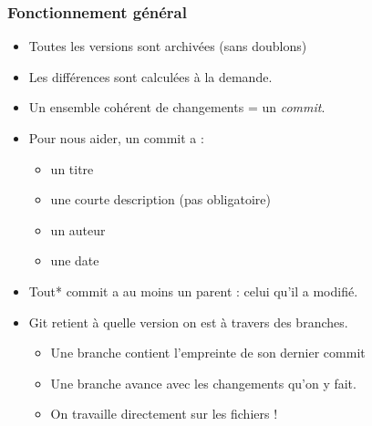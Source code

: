 \documentclass[compress]{beamer}
\begin{document}
\begin{frame}
	\frametitle{Fonctionnement général}
	\begin{itemize}
		\item Toutes les versions sont archivées (sans doublons) \pause
		\item Les différences sont calculées à la demande. \pause
		\item Un ensemble cohérent de changements = un \emph{commit}. \pause
		\item Pour nous aider, un commit a :
			\begin{itemize}
				\item un titre
				\item une courte description (pas obligatoire) \pause
				\item un auteur
				\item une date \pause
			\end{itemize}
		\item Tout* commit a au moins un parent : celui qu'il a modifié. \pause
		\item Git retient à quelle version on est à travers des branches.
			\begin{itemize}
				\item Une branche contient l'empreinte de son dernier commit
					\pause
				\item Une branche avance avec les changements qu'on y fait.
					\pause
				\item On travaille directement sur les fichiers !
			\end{itemize}
	\end{itemize}
\end{frame}


\end{document}
